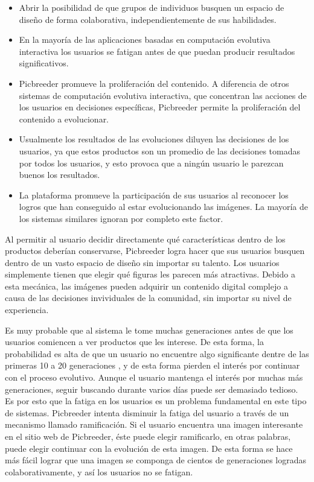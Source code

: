 \begin{itemize}
  \item Abrir la posibilidad de que grupos de individuos busquen un espacio de diseño de forma colaborativa, independientemente de sus habilidades.
  \item En la mayoría de las aplicaciones basadas en computación evolutiva interactiva los usuarios se fatigan antes de que puedan producir resultados significativos.
  \item Picbreeder promueve la proliferación del contenido. A diferencia de otros sistemas de computación evolutiva interactiva, que concentran las acciones de los usuarios en decisiones específicas, Picbreeder permite la proliferación del contenido a evolucionar.
  \item Usualmente los resultados de las evoluciones diluyen las decisiones de los usuarios, ya que estos productos son un promedio de las decisiones tomadas por todos los usuarios, y esto provoca que a ningún usuario le parezcan buenos los resultados.
  \item La plataforma promueve la participación de sus usuarios al reconocer los logros que han conseguido al estar evolucionando las imágenes. La mayoría de los sistemas similares ignoran por completo este factor.
\end{itemize}

Al permitir al usuario decidir directamente qué características dentro de los productos deberían conservarse, Picbreeder logra hacer que sus usuarios busquen dentro de un vasto espacio de diseño sin importar su talento. Los usuarios simplemente tienen que elegir qué figuras les parecen más atractivas. Debido a esta mecánica, las imágenes pueden adquirir un contenido digital complejo a causa de las decisiones invividuales de la comunidad, sin importar su nivel de experiencia.

Es muy probable que al sistema le tome muchas generaciones antes de que los usuarios comiencen a ver productos que les interese. De esta forma, la probabilidad es alta de que un usuario no encuentre algo significante dentre de las primeras 10 a 20 generaciones \cite{takagi2001interactive}, y de esta forma pierden el interés por continuar con el proceso evolutivo. Aunque el usuario mantenga el interés por muchas más generaciones, seguir buscando durante varios días puede ser demasiado tedioso. Es por esto que la fatiga en los usuarios es un problema fundamental en este tipo de sistemas. Picbreeder intenta disminuir la fatiga del usuario a través de un mecanismo llamado ramificación. Si el usuario encuentra una imagen interesante en el sitio web de Picbreeder, éste puede elegir ramificarlo, en otras palabras, puede elegir continuar con la evolución de esta imagen. De esta forma se hace más fácil lograr que una imagen se componga de cientos de generaciones logradas colaborativamente, y así los usuarios no se fatigan.

